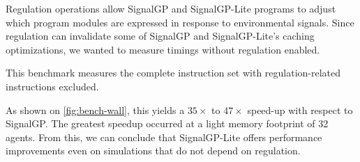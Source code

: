 Regulation operations allow SignalGP and SignalGP-Lite programs to adjust which program modules are expressed in response to environmental signals.
Since regulation can invalidate some of SignalGP and SignalGP-Lite's caching optimizations, we wanted to measure timings without regulation enabled.

This benchmark measures the complete instruction set with regulation-related instructions excluded.

As shown on \autoref{fig:bench-wall}, this yields a $35\times$ to $47\times$ speed-up with respect to SignalGP.
The greatest speedup occurred at a light memory footprint of 32 agents.
From this, we can conclude that SignalGP-Lite offers performance improvements even on simulations that do not depend on regulation.
